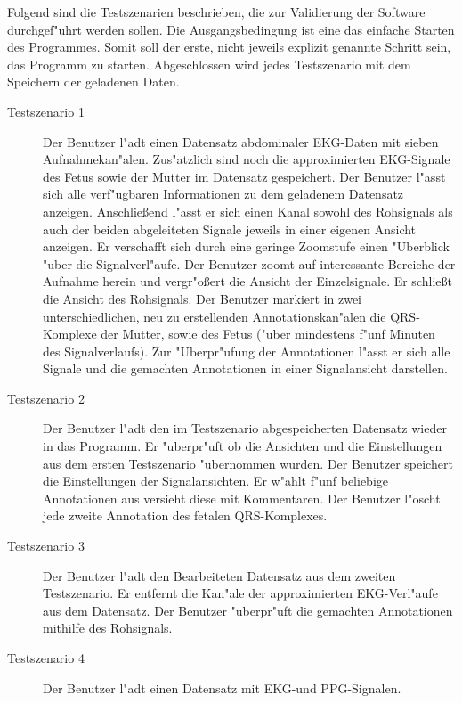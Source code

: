 Folgend sind die Testszenarien beschrieben, die zur Validierung der Software durchgef"uhrt werden sollen.
Die Ausgangsbedingung ist eine das einfache Starten des Programmes.
Somit soll der erste, nicht jeweils explizit genannte Schritt sein, das Programm zu starten.
Abgeschlossen wird jedes Testszenario mit dem Speichern der geladenen Daten.
\begin{description}
\item[Testszenario 1] Der Benutzer l"adt einen Datensatz abdominaler \ac{EKG}-Daten mit sieben Aufnahmekan"alen.
					  Zus"atzlich sind noch die approximierten \ac{EKG}-Signale des Fetus sowie der Mutter im Datensatz gespeichert.
					  Der Benutzer l"asst sich alle verf"ugbaren Informationen zu dem geladenem Datensatz anzeigen.
					  Anschlie\ss end l"asst er sich einen Kanal sowohl des Rohsignals als auch der beiden abgeleiteten Signale jeweils in einer eigenen Ansicht anzeigen.
					  Er verschafft sich durch eine geringe Zoomstufe einen "Uberblick "uber die Signalverl"aufe.
					  Der Benutzer zoomt auf interessante Bereiche der Aufnahme herein und vergr"o\ss ert die Ansicht der Einzelsignale.
					  Er schlie{\ss}t die Ansicht des Rohsignals.
					  Der Benutzer markiert in zwei unterschiedlichen, neu zu erstellenden Annotationskan"alen die QRS-Komplexe der Mutter, sowie des Fetus ("uber mindestens f"unf Minuten des Signalverlaufs).
					  Zur "Uberpr"ufung der Annotationen l"asst er sich alle Signale und die gemachten Annotationen in einer Signalansicht darstellen.
\item[Testszenario 2] Der Benutzer l"adt den im Testszenario abgespeicherten Datensatz wieder in das Programm.
					  Er "uberpr"uft ob die Ansichten und die Einstellungen aus dem ersten Testszenario "ubernommen wurden.
					  Der Benutzer speichert die Einstellungen der Signalansichten.
					  Er w"ahlt f"unf beliebige Annotationen aus versieht diese mit Kommentaren.
					  Der Benutzer l"oscht jede zweite Annotation des fetalen QRS-Komplexes.
\item[Testszenario 3] Der Benutzer l"adt den Bearbeiteten Datensatz aus dem zweiten Testszenario.
					  Er entfernt die Kan"ale der approximierten \ac{EKG}-Verl"aufe aus dem Datensatz.
					  Der Benutzer "uberpr"uft die gemachten Annotationen mithilfe des Rohsignals.
\item[Testszenario 4] Der Benutzer l"adt einen Datensatz mit \ac{EKG}-und \ac{PPG}-Signalen.

\end{description}
